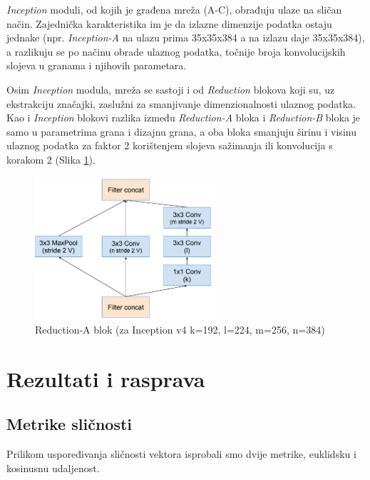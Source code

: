 \documentclass[times, utf8, proizvoljni, numeric]{fer}
\begin{document}
\textit{Inception} moduli, od kojih je građena mreža (A-C), obrađuju ulaze na sličan način. Zajednička karakteristika im je da izlazne dimenzije podatka ostaju jednake (npr. \textit{Inception-A} na ulazu prima 35x35x384 a na izlazu daje 35x35x384), a razlikuju se po načinu obrade ulaznog podatka, točnije broja konvolucijskih slojeva u granama i njihovih parametara.

Osim \textit{Inception} modula, mreža se sastoji i od \textit{Reduction} blokova koji su, uz ekstrakciju značajki, zaslužni za smanjivanje dimenzionalnosti ulaznog podatka. Kao i \textit{Inception} blokovi razlika između \textit{Reduction-A} bloka i \textit{Reduction-B} bloka je samo u parametrima grana i dizajnu grana, a oba bloka smanjuju širinu i visinu ulaznog podatka za faktor 2 korištenjem slojeva sažimanja ili konvolucija s korakom 2 (Slika \ref{fg:inception_reduction_a}).

\begin{figure}[!ht]
	\begin{center}
		\captionsetup{justification=centering}
		\includegraphics[width=0.6\textwidth]{./imgs/inception_reduction_a.png}
		\caption{Reduction-A blok (za Inception v4 k=192, l=224, m=256, n=384) \cite{Inceptionv4}}
		\label{fg:inception_reduction_a}
	\end{center}
\end{figure}
\chapter{Rezultati i rasprava}

\section{Metrike sličnosti}

Prilikom uspoređivanja sličnosti vektora isprobali smo dvije metrike, euklidsku i kosinusnu udaljenost. 
\end{document}
